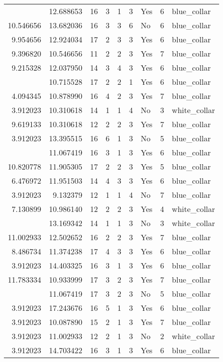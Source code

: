 \documentclass[
]{article}
\begin{document}
\begin{longtable}[t]{rrrrrllrl}
\addlinespace
3.912023 & 12.688653 & 16 & 3 & 1 & 3 & Yes & 6 & blue\_collar\\
10.546656 & 13.682036 & 16 & 3 & 3 & 6 & No & 6 & blue\_collar\\
9.954656 & 12.924034 & 17 & 2 & 3 & 3 & Yes & 6 & blue\_collar\\
9.396820 & 10.546656 & 11 & 2 & 2 & 3 & Yes & 7 & blue\_collar\\
9.215328 & 12.037950 & 14 & 3 & 4 & 3 & Yes & 6 & blue\_collar\\
\addlinespace
7.346010 & 10.715528 & 17 & 2 & 2 & 1 & Yes & 6 & blue\_collar\\
4.094345 & 10.878990 & 16 & 4 & 2 & 3 & Yes & 7 & blue\_collar\\
3.912023 & 10.310618 & 14 & 1 & 1 & 4 & No & 3 & white\_collar\\
9.619133 & 10.310618 & 12 & 2 & 2 & 3 & Yes & 7 & blue\_collar\\
3.912023 & 13.395515 & 16 & 6 & 1 & 3 & No & 5 & blue\_collar\\
\addlinespace
3.912023 & 11.067419 & 16 & 3 & 1 & 3 & Yes & 6 & blue\_collar\\
10.820778 & 11.905305 & 17 & 2 & 2 & 3 & Yes & 5 & blue\_collar\\
6.476972 & 11.951503 & 14 & 4 & 3 & 3 & Yes & 6 & blue\_collar\\
3.912023 & 9.132379 & 12 & 1 & 1 & 4 & No & 7 & blue\_collar\\
7.130899 & 10.986140 & 12 & 2 & 2 & 3 & Yes & 4 & white\_collar\\
\addlinespace
3.912023 & 13.169342 & 14 & 1 & 1 & 3 & No & 3 & white\_collar\\
11.002933 & 12.502652 & 16 & 2 & 2 & 3 & Yes & 7 & blue\_collar\\
8.486734 & 11.374238 & 17 & 4 & 3 & 3 & Yes & 6 & blue\_collar\\
3.912023 & 14.403325 & 16 & 3 & 1 & 3 & Yes & 6 & blue\_collar\\
11.783334 & 10.933999 & 17 & 3 & 2 & 3 & Yes & 7 & blue\_collar\\
\addlinespace
11.225910 & 11.067419 & 17 & 3 & 2 & 3 & No & 5 & blue\_collar\\
3.912023 & 17.243676 & 16 & 5 & 1 & 3 & Yes & 6 & blue\_collar\\
3.912023 & 10.087890 & 15 & 2 & 1 & 3 & Yes & 7 & blue\_collar\\
3.912023 & 11.002933 & 12 & 2 & 1 & 3 & No & 2 & white\_collar\\
3.912023 & 14.703422 & 16 & 3 & 1 & 3 & Yes & 6 & blue\_collar\\

\end{longtable}
\end{document}
